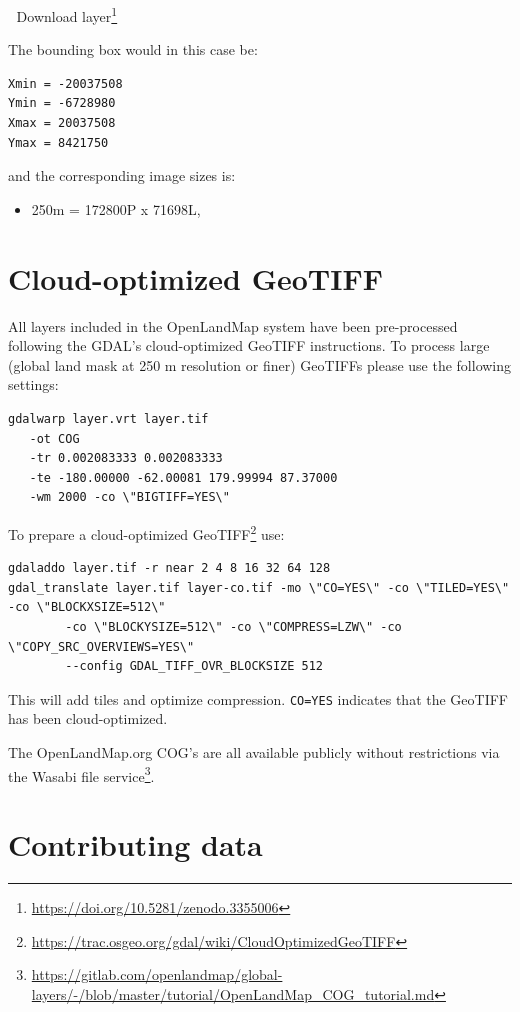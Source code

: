 \documentclass[
  graybox,natbib,nospthms]{svmono}
\providecommand{\tightlist}{%
  \setlength{\itemsep}{0pt}\setlength{\parskip}{0pt}}
\providecommand{\tightlist}{\setlength{\itemsep}{0pt}\setlength{\parskip}{0pt}}
\renewcommand{\href}[2]{#2 (\url{#1})}
\renewcommand{\href}[2]{#2\footnote{\url{#1}}}
\begin{document}
📂 \href{https://doi.org/10.5281/zenodo.3355006}{Download layer}

The bounding box would in this case be:

\begin{verbatim}
Xmin = -20037508
Ymin = -6728980
Xmax = 20037508
Ymax = 8421750
\end{verbatim}

and the corresponding image sizes is:

\begin{itemize}
\tightlist
\item
  250m = 172800P x 71698L,
\end{itemize}

\hypertarget{cloud-optimized-geotiff}{%
\section{Cloud-optimized GeoTIFF}\label{cloud-optimized-geotiff}}

All layers included in the OpenLandMap system have been pre-processed following the GDAL's cloud-optimized GeoTIFF
instructions. To process large (global land mask at 250 m resolution or finer) GeoTIFFs please use the following
settings:

\begin{verbatim}
gdalwarp layer.vrt layer.tif 
   -ot COG
   -tr 0.002083333 0.002083333 
   -te -180.00000 -62.00081 179.99994 87.37000
   -wm 2000 -co \"BIGTIFF=YES\"
\end{verbatim}

To prepare a \href{https://trac.osgeo.org/gdal/wiki/CloudOptimizedGeoTIFF}{cloud-optimized GeoTIFF} use:

\begin{verbatim}
gdaladdo layer.tif -r near 2 4 8 16 32 64 128
gdal_translate layer.tif layer-co.tif -mo \"CO=YES\" -co \"TILED=YES\" -co \"BLOCKXSIZE=512\" 
        -co \"BLOCKYSIZE=512\" -co \"COMPRESS=LZW\" -co \"COPY_SRC_OVERVIEWS=YES\" 
        --config GDAL_TIFF_OVR_BLOCKSIZE 512
\end{verbatim}

This will add tiles and optimize compression. \texttt{CO=YES} indicates that the GeoTIFF has been cloud-optimized.

The OpenLandMap.org COG's are all available publicly without restrictions via the
\href{https://gitlab.com/openlandmap/global-layers/-/blob/master/tutorial/OpenLandMap_COG_tutorial.md}{Wasabi file service}.

\hypertarget{contributing-data}{%
\section*{Contributing data}\label{contributing-data}}
\end{document}
